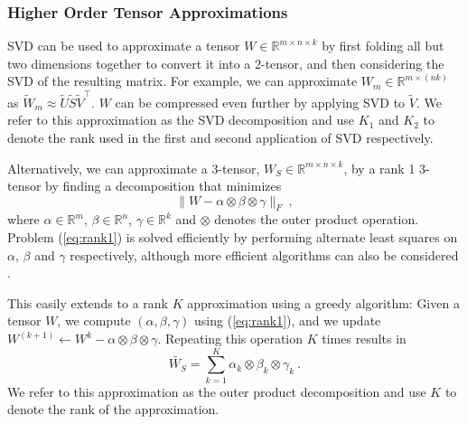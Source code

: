 \subsubsection{Higher Order Tensor Approximations}\label{subsubsec:svd_tensor}
SVD can be used to approximate a tensor $W \in \mathbb{R}^{m \times n \times k}$
by first folding all but two dimensions together to convert it into a $2$-tensor, %
and then considering the SVD of the resulting matrix. For example, we can approximate $W_m \in \mathbb{R}^{m \times (nk)}$ as $\tilde{W}_m \approx \tilde{U}\tilde{S}\tilde{V}^{\top}$. 
$W$ can be compressed even further by applying SVD to $\tilde{V}$. We refer to this approximation as the SVD decomposition and use $K_1$ and $K_2$ to denote the rank used in the first and second application of SVD respectively.

Alternatively, we can approximate a 3-tensor, $W_S \in \mathbb{R}^{m \times n \times k}$, by a rank 1 3-tensor by finding a decomposition that minimizes 
\begin{equation}
\label{eq:rank1}
	\| W - \alpha \otimes \beta \otimes \gamma \|_F~,
\end{equation} 
where $\alpha \in \mathbb{R}^m$, $\beta \in \mathbb{R}^{n}$, $\gamma \in \mathbb{R}^k$ and $\otimes$ denotes the outer product operation.
Problem (\ref{eq:rank1}) is solved efficiently by performing alternate least squares 
on $\alpha$, $\beta$ and $\gamma$ respectively, although more efficient algorithms can also be 
considered \cite{rankonetensors}. 

This easily extends to a rank $K$ approximation using a greedy algorithm: Given a 
tensor $W$, we compute $(\alpha, \beta, \gamma)$ using (\ref{eq:rank1}), and we update 
$W^{(k+1)} \leftarrow W^{k} - \alpha \otimes \beta \otimes \gamma$. Repeating this operation $K$
times results in 
\begin{equation}
\label{eq:rankK}
	\tilde{W_S} = \sum_{k = 1}^{K} \alpha_k \otimes \beta_k \otimes \gamma_k ~.
\end{equation} 
We refer to this approximation as the outer product decomposition and use $K$ to denote the rank of the approximation.

